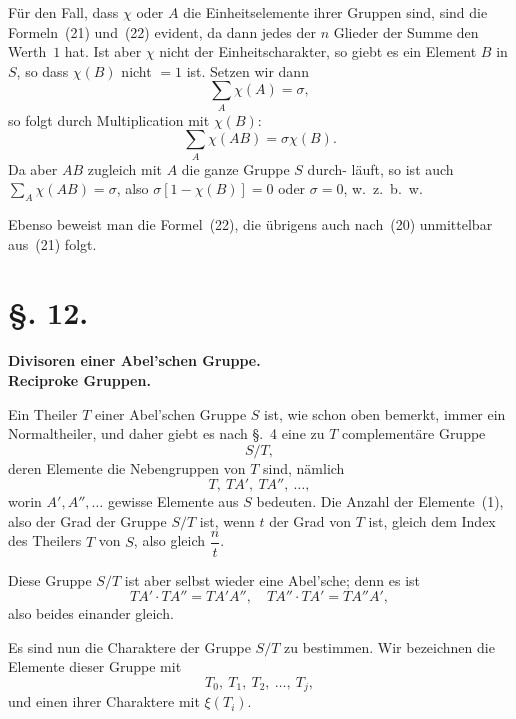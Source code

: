 \documentclass[12pt,a4paper]{article}
\theoremstyle{plain}
\theoremstyle{definition}
\theoremstyle{remark}
\begin{document}
Für den Fall, dass $\chi$ oder $A$ die Einheitselemente ihrer
Gruppen sind, sind die Formeln~(21) und~(22) evident, da dann
jedes der $n$ Glieder der Summe den Werth~$1$ hat. Ist aber $\chi$
nicht der Einheitscharakter, so giebt es ein Element $B$ in $S$, so
dass $\chi(B)$ nicht $= 1$ ist. Setzen wir dann
\[
\sum_A \chi(A) = \sigma,
\]
so folgt durch Multiplication mit $\chi(B)$:
\[
\sum_A \chi(AB) = \sigma \chi(B).
\]
Da aber $AB$ zugleich mit $A$ die ganze Gruppe $S$ durch-
läuft, so ist auch $\sum_A \chi(AB) = \sigma$, also $\sigma[1 - \chi(B)] = 0$ oder
$\sigma = 0$, w.~z.~b.~w.

Ebenso beweist man die Formel~(22), die übrigens auch
nach~(20) unmittelbar aus~(21) folgt.


\section*{\S. 12.}
\begin{center}
\textbf{Divisoren einer Abel'schen Gruppe.}\\
\textbf{Reciproke Gruppen.}
\end{center}

Ein Theiler $T$ einer Abel'schen Gruppe $S$ ist, wie schon
oben bemerkt, immer ein Normaltheiler, und daher giebt es nach
\S.~4 eine zu $T$ complementäre Gruppe
\[
S/T,
\]
deren Elemente die Nebengruppen von $T$ sind, nämlich
\begin{equation}\tag{1}
T, \ TA', \ TA'', \ \ldots,
\end{equation}
worin $A', A'', \ldots$ gewisse Elemente aus $S$ bedeuten. Die Anzahl
der Elemente~(1), also der Grad der Gruppe $S/T$ ist, wenn $t$
der Grad von $T$ ist, gleich dem Index des Theilers $T$ von $S$,
also gleich $\dfrac{n}{t}$.

Diese Gruppe $S/T$ ist aber selbst wieder eine Abel'sche;
denn es ist
\[
TA' \cdot TA'' = TA'A'', \quad TA'' \cdot TA' = TA''A',
\]
also beides einander gleich.

Es sind nun die Charaktere der Gruppe $S/T$ zu bestimmen.
Wir bezeichnen die Elemente dieser Gruppe mit
\begin{equation}\tag{2}
T_0, \ T_1, \ T_2, \ \ldots, \ T_j,
\end{equation}
und einen ihrer Charaktere mit $\xi(T_i)$.
\end{document}
